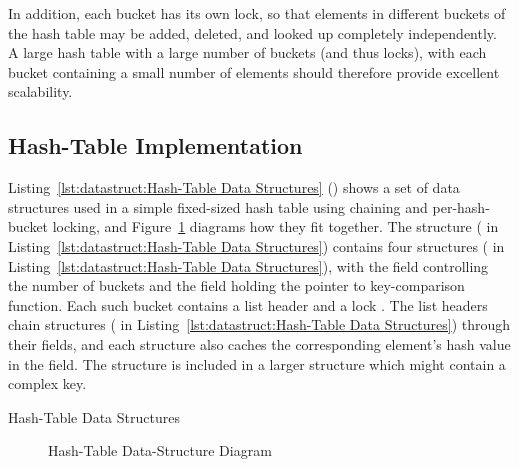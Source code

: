 In addition, each bucket has its own lock, so that elements in different
buckets of the hash table may be added, deleted, and looked up completely
independently.  A large hash table with a large number of buckets (and
thus locks), with each bucket containing a small number of elements
should therefore provide excellent scalability.

\subsection{Hash-Table Implementation}
\label{sec:datastruct:Hash-Table Implementation}

\begin{fcvref}
Listing~\ref{lst:datastruct:Hash-Table Data Structures}
()
shows a set of data structures used in a simple fixed-sized hash
table using chaining and per-hash-bucket locking, and
Figure~\ref{fig:datastruct:Hash-Table Data-Structure Diagram}
diagrams how they fit together.
The  structure ( in
Listing~\ref{lst:datastruct:Hash-Table Data Structures})
contains four  structures
( in
Listing~\ref{lst:datastruct:Hash-Table Data Structures}),
with the  field controlling the number of buckets
and the  field holding the pointer to key-comparison
function.
Each such bucket contains a list header  and
a lock .
The list headers chain  structures
( in
Listing~\ref{lst:datastruct:Hash-Table Data Structures})
through their
 fields, and each  structure also caches
the corresponding element's hash value in the  field.
The  structure is included in a larger structure
which might contain a complex key.
\end{fcvref}

\begin{listing}[tb]

\caption{Hash-Table Data Structures}
\label{lst:datastruct:Hash-Table Data Structures}
\end{listing}

\begin{figure}[tb]
\centering
{}
\caption{Hash-Table Data-Structure Diagram}
\label{fig:datastruct:Hash-Table Data-Structure Diagram}
\end{figure}

